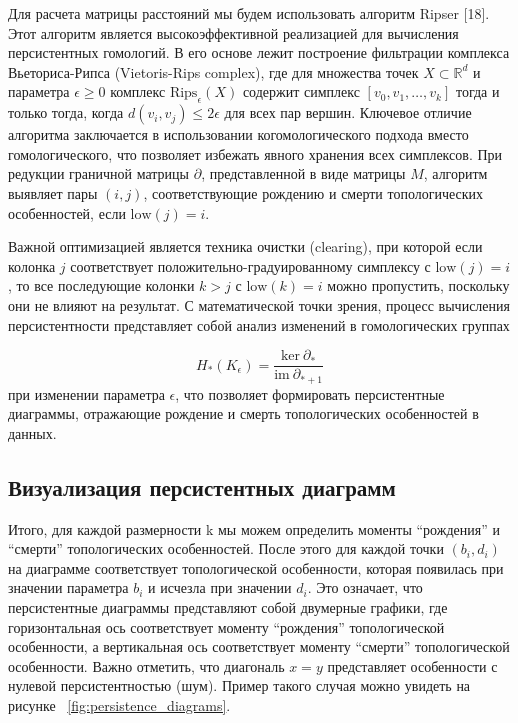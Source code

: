 \documentclass[a4paper,12pt]{extarticle}
\begin{document}
Для расчета матрицы расстояний мы будем использовать алгоритм Ripser [18]. Этот алгоритм является высокоэффективной реализацией для вычисления персистентных гомологий. В его основе лежит построение фильтрации комплекса Вьеториса-Рипса (Vietoris-Rips complex), где для множества точек $X \subset \mathbb{R}^d$ и параметра $\epsilon \geq 0$ комплекс $\text{Rips}_\epsilon(X)$ содержит симплекс $[v_0, v_1, \ldots, v_k]$ тогда и только тогда, когда $d(v_i, v_j) \leq 2\epsilon$ для всех пар вершин. Ключевое отличие алгоритма заключается в использовании когомологического подхода вместо гомологического, что позволяет избежать явного хранения всех симплексов. При редукции граничной матрицы $\partial$, представленной в виде матрицы $M$, алгоритм выявляет пары $(i, j)$, соответствующие рождению и смерти топологических особенностей, если $\text{low}(j) = i$. 

Важной оптимизацией является техника очистки (clearing), при которой если колонка $j$ соответствует положительно-градуированному симплексу с $\text{low}(j) = i$, то все последующие колонки $k > j$ с $\text{low}(k) = i$ можно пропустить, поскольку они не влияют на результат. С математической точки зрения, процесс вычисления персистентности представляет собой анализ изменений в гомологических группах 

    \begin{equation} H_*(K_\epsilon) = \frac{\text{ker} \ \partial_*}{\text{im} \ \partial_{*+1}} 
    \end{equation}
    при изменении параметра $\epsilon$, что позволяет формировать персистентные диаграммы, отражающие рождение и смерть топологических особенностей в данных.

\subsection{Визуализация персистентных диаграмм}

Итого, для каждой размерности k мы можем определить моменты ``рождения'' и ``смерти'' топологических особенностей. После этого для каждой точки $(b_i, d_i)$ на диаграмме соответствует топологической особенности, которая появилась при значении параметра $b_i$ и исчезла при значении $d_i$. Это означает, что персистентные диаграммы представляют собой двумерные графики, где горизонтальная ось соответствует моменту ``рождения'' топологической особенности, а вертикальная ось соответствует моменту ``смерти'' топологической особенности. Важно отметить, что диагональ $x = y$ представляет особенности с нулевой персистентностью (шум). Пример такого случая можно увидеть на рисунке ~\ref{fig:persistence_diagrams}.
\end{document}
